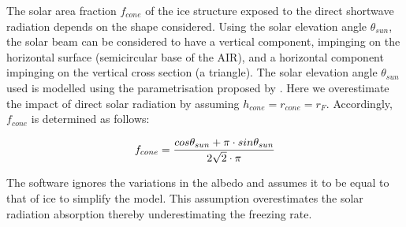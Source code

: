 \documentclass[utf8]{frontiersSCNS}
\begin{document}
The solar area fraction $f_{cone}$ of the ice structure exposed to the direct shortwave radiation depends on the
shape considered. Using the solar elevation angle $\theta_{sun}$, the solar beam can be considered to have a
vertical component, impinging on the horizontal surface (semicircular base of the AIR), and a horizontal
component impinging on the vertical cross section (a triangle). The solar elevation angle $\theta_{sun}$ used is
modelled using the parametrisation proposed by \cite{woolfComputationSolarElevation1968}. Here we overestimate the impact of direct
solar radiation by assuming $h_{cone} = r_{cone} = r_{F}$. Accordingly, $f_{cone}$ is determined as follows:

\begin{equation}
	\begin{split}
		f_{cone}& =\frac{ cos \theta_{sun} + \pi \cdot sin \theta_{sun} }{2\sqrt{2} \cdot \pi }\\
	\end{split}
	\label{ eqn:f_{cone}}
\end{equation}

The software ignores the variations in the albedo and assumes it to be equal to that of ice to simplify the
model. This assumption overestimates the solar radiation absorption thereby underestimating the freezing rate.


 
\end{document}
